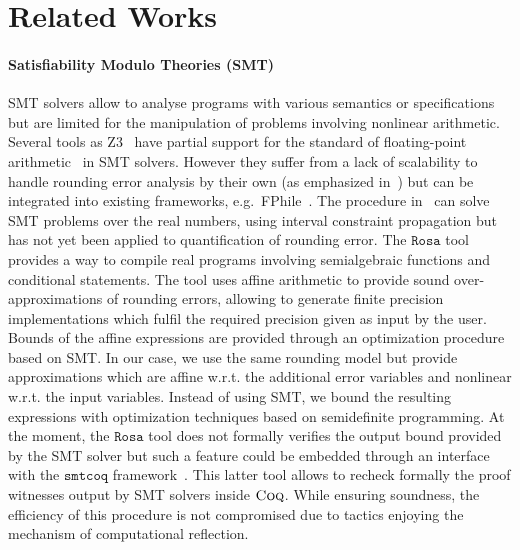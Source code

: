 \documentclass[preprint,fleqn,nocopyrightspace]{sigplanconf}
\newcommand{\smtcoq}{\mathtt{smtcoq}}
\newcommand{\coq}{\text{\sc Coq}}
\newcommand{\rosa}{\mathtt{Rosa}}
\theoremstyle{plain}
\begin{document}
\section{Related Works}
%
\paragraph{Satisfiability Modulo Theories (SMT)}
SMT solvers allow to analyse programs with various semantics or specifications but are limited for the manipulation of problems involving nonlinear arithmetic. 
Several tools as {\sc Z3}~\cite{DeMoura08} have partial support for the standard of floating-point arithmetic~\cite{smtFPA2010} in SMT solvers. However they suffer from a lack of  scalability to handle rounding error analysis by their own (as emphasized in~\cite{Darulova14Popl}) but can be integrated into existing frameworks, e.g.~{\sc FPhile}~\cite{PaganelliA13}. The procedure in~\cite{dReal13} can solve SMT problems over the real numbers, using interval constraint propagation but has not yet been applied to quantification of rounding error.
The $\rosa$ tool~\cite{Darulova14Popl} provides a way to compile real programs involving semialgebraic functions and conditional statements.
The tool uses affine arithmetic to provide sound over-approximations of rounding errors, allowing to generate finite precision implementations which fulfil the required precision given as input by the user. Bounds of the affine expressions are provided through an optimization procedure based on SMT. In our case, we use the same rounding model but provide approximations which are affine w.r.t. the additional error variables and nonlinear w.r.t. the input variables. Instead of using SMT, we bound the resulting expressions with optimization techniques based on semidefinite programming.
At the moment, the $\rosa$ tool does not formally verifies the output bound provided by the SMT solver but such a feature could be embedded through an interface with the $\smtcoq$ framework~\cite{smtcoq}. This latter tool allows to recheck formally the proof witnesses output by SMT solvers inside $\coq$. While ensuring soundness, the efficiency of this procedure is not compromised due to tactics enjoying the mechanism of computational reflection.
%
\end{document}
